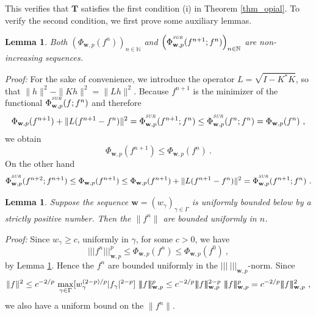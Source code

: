 \documentclass[10pt]{article}
\newtheorem{lemma}[theorem]{Lemma}
\newcommand{\QED}{\hfill \raisebox{-2pt}{\rule{5.6pt}{8pt}\rule{4pt}{0pt}}%
  \smallskip\par}
\def\N{\mathbb{N}}
\def\T{\mathbf{T}}
\def\K{K^*}
\def\SUR{\mbox{\tiny{\it{SUR}}}}
\def\ag{w_{\gamma}}
\def\g{\gamma}
\def\Vvert{\vert\!\vert\!\vert}
\begin{document}
This verifies that $\T$ satisfies the first condition (i) in Theorem
\ref{thm_opial}.
To verify the second condition, we first prove some auxiliary lemmas.
\begin{lemma}
\label{cost2}
Both $\left({\Phi}_{\mathbf{w},p}(f^n)\right)_{n \in \N}$ and
$\left({\Phi}^{^{\SUR}}_{\mathbf{w},p}(f^{n+1} ; f^n)\right)_{n
\in
\N}$ are  non-increasing sequences.
\end{lemma}
{\em Proof:} For the sake of convenience, we introduce the operator
$L = \sqrt{I -\K K }$, so that $\|h\|^2-\|Kh\|^2= \|Lh\|^2$. Because
$f^{n+1}$ is the
minimizer of the functional
${\Phi}^{^{\SUR}}_{\mathbf{w},p}(f ; f^n)$ and therefore
\begin{equation*}
\Phi_{\mathbf{w},p}(f^{n+1})+\| L(f^{n+1}-f^n)\|^2 =
{\Phi}^{^{\SUR}}_{\mathbf{w},p}(f^{n+1} ; f^n)
\leq
{\Phi}^{^{\SUR}}_{\mathbf{w},p}(f^n ; f^n)=\Phi_{\mathbf{w},p}(f^n)\
,
\end{equation*}
we obtain
\begin{equation*}
\Phi_{\mathbf{w},p}(f^{n+1})\leq \Phi_{\mathbf{w},p}(f^n) \ .
\end{equation*}
On the other hand
\begin{equation*}
{\Phi}^{^{\SUR}}_{\mathbf{w},p}(f^{n+2} ; f^{n+1})\leq
\Phi_{\mathbf{w},p}(f^{n+1})
\leq \Phi_{\mathbf{w},p}(f^{n+1})+
\|L(f^{n+1}-f^n)\|^2={\Phi}^{^{\SUR}}_{\mathbf{w},p}(f^{n+1} ; f^n)\
.
\end{equation*}
\hfill\QED\bigskip

\begin{lemma}
\label{unifbddness}
Suppose the sequence $\mathbf{w}=(\ag)_{\g \in \Gamma}$ is uniformly bounded
below by a strictly positive number.
Then the $\|f^n\|$ are bounded uniformly in $n$.
\end{lemma}
{\em Proof:} Since $\ag \geq c$, uniformly in $\g$, for some $c>0$, we have
\begin{equation*}
\Vvert f^n\Vvert_{\mathbf{w},p}^p
\leq  \Phi_{\mathbf{w},p}(f^n) \leq
\Phi_{\mathbf{w},p}(f^0)~,
\end{equation*}
by Lemma \ref{cost2}. Hence the $f^n$ are bounded uniformly
in the $\Vvert ~\Vvert_{\mathbf{w},p}$-norm.
Since
\begin{equation}
\label{bdL2Ban}
\| f \|^2 \leq c^{-2/p} \ {\mathop{\rm max}_{\g \in \Gamma}}
[\ag^{(2-p)/p} |f_{\g}|^{2-p}]\ \Vvert f \Vvert_{\mathbf{w},p}^p
\leq c^{-2/p} \Vvert f\Vvert_{\mathbf{w},p}^{2-p}\ \Vvert f
\Vvert_{\mathbf{w},p}^p = c^{-2/p} \Vvert f
\Vvert_{\mathbf{w},p}^2\ ,
\end{equation}
we also have a uniform bound on the $\|f^n\|$.
\hfill\QED\bigskip
\end{document}
